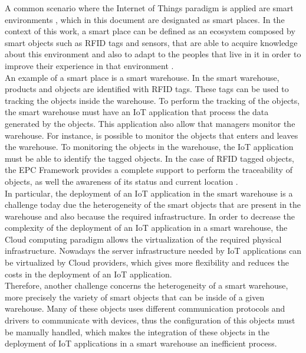 A common scenario where the Internet of Things paradigm is applied are smart environments \cite{atzori2010internet},
which in this document are designated as smart places. In the context of this work,
a smart place can be defined as an ecosystem composed by smart objects such as RFID
tags and sensors, that are able to acquire knowledge about this environment and also to
adapt to the peoples that live in it in order to improve their experience in that environment \cite{cook2004smart}.\\

An example of a smart place is a smart warehouse. In the smart warehouse, products and objects
are identified with RFID tags. These tags can be used to tracking the objects inside the warehouse.
To perform the tracking of the objects, the smart warehouse must have an IoT application that process
the data generated by the objects. This application also allow that managers monitor the warehouse.
For instance, is possible to monitor the objects that enters and leaves the warehouse.
To monitoring the objects in the warehouse, the IoT application must be able to identify
the tagged objects. In the case of RFID tagged objects, the EPC Framework provides a complete
support to perform the traceability of objects, as well the awareness of its status and
current location \cite{atzori2010internet}.\\

In particular, the deployment of an IoT application in the smart warehouse is a challenge today
due the heterogeneity of the smart objects that are present in the warehouse and also
because the required infrastructure. In order to decrease the complexity of the deployment
of an IoT application in a smart warehouse, the Cloud computing paradigm allows the virtualization
of the required physical infrastructure. Nowadays the server infrastructure needed by IoT
applications can be virtualized by Cloud providers, which gives more flexibility and reduces
the costs in the deployment of an IoT application.\\

Therefore, another challenge concerns the heterogeneity of a smart warehouse, more precisely
the variety of smart objects that can be inside of a given warehouse. Many of these objects uses
different communication protocols and drivers to communicate with devices, thus the configuration
of this objects must be manually handled, which makes the integration of these objects in
the deployment of IoT applications in a smart warehouse an inefficient process.
